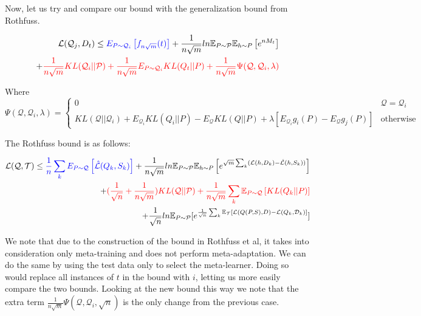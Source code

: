 \documentclass[letterpaper]{article}
\theoremstyle{definition}
\begin{document}
Now, let us try and compare our bound with the generalization bound from Rothfuss.

\begin{equation*}
\begin{split}
\mathcal{L}(\mathcal{Q}_j, D_t)\leq \textcolor{blue}{E_{P\sim \mathcal{Q}_i} \left [ f_{n\sqrt{m}}(t)\right ]} + \frac{1}{n\sqrt{m}} ln\mathbb{E}_{P\sim \mathcal{P}}\mathbb{E}_{h\sim P}\left [ e^{nM_t} \right ]\\
+\textcolor{red}{\frac{1}{n\sqrt{m}} KL(\mathcal{Q}_i||\mathcal{P}) +\frac{1}{n\sqrt{m}}E_{P\sim \mathcal{Q}_i} KL(Q_t||P) + \frac{1}{n\sqrt{m}}\Psi(\mathcal{Q},\mathcal{Q}_i,\lambda) }
\end{split}
\end{equation*}

Where \begin{equation*}
 \Psi(\mathcal{Q},\mathcal{Q}_i,\lambda)=\begin{cases}
0 &\mathcal{Q}=\mathcal{Q}_i\\
KL(\mathcal{Q}||\mathcal{Q}_i)+ E_{\mathcal{Q}_i} KL(Q_i||P) - E_{\mathcal{Q}} KL(Q||P) +\lambda\left [ E_{\mathcal{Q}_i} g_i(P)
- E_{\mathcal{Q}} g_j(P)\right ] &\text{otherwise}
\end{cases}
\end{equation*}

The Rothfuss bound is as follows:

\begin{equation*}
\begin{split}
\mathcal{L}(\mathcal{Q}, \mathcal{T}) \leq \textcolor{blue}{\frac{1}{n}\sum_k E_{P\sim \mathcal{Q}} \left [ \hat{\mathcal{L}}(Q_k,S_k) \right ]} 
+ \frac{1}{n\sqrt{m}} ln\mathbb{E}_{P\sim \mathcal{P}}\mathbb{E}_{h\sim P}\left [ e^{\sqrt{m}\sum_k (\mathcal{L}(h, D_k)-\hat{\mathcal{L}}(h, S_k))} \right ]
\\+
\textcolor{red}{(\frac{1}{\sqrt{n}}+ \frac{1}{n\sqrt{m}}) KL(\mathcal{Q}||\mathcal{P}) + \frac{1}{n\sqrt{m}}\sum_k \mathbb{E}_{P\sim \mathcal{Q}} \left [KL(Q_k||P) \right ]}\\ +\frac{1}{\sqrt{n}}ln \mathbb{E}_{P\sim \mathcal{P}} [e^{\frac{1}{\sqrt{n}}\sum_{k}\mathbb{E}_{\mathcal{T}}[\mathcal{L}(Q(P,S),D)- \mathcal{L}(Q_k, \mathcal{D}_k)]}]
\end{split}
\end{equation*}

We note that due to the construction of the bound in Rothfuss et al, it takes into consideration only meta-training and does not perform meta-adaptation. We can do the same by using the test data only to select the meta-learner. Doing so would replace all instances of $t$ in the bound with $i$, letting us more easily compare the two bounds. Looking at the new bound this way we note that the extra term $\frac{1}{n\sqrt{m}}\Psi(\mathcal{Q}, \mathcal{Q}_i, \sqrt{n})$ is the only change from the previous case.
\end{document}

